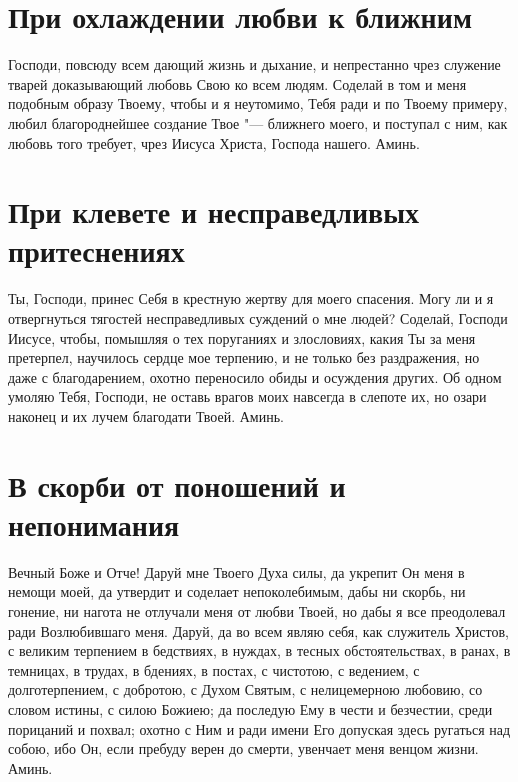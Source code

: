 \section{При охлаждении любви к ближним}\begin{mymulticols}
 

Господи, повсюду всем дающий жизнь и дыхание, и непрестанно чрез служение тварей доказывающий любовь Свою ко всем людям. Соделай в том и меня подобным образу Твоему, чтобы и я неутомимо, Тебя ради и по Твоему примеру, любил благороднейшее создание Твое "--- ближнего моего, и поступал с ним, как любовь того требует, чрез Иисуса Христа, Господа нашего. Аминь.

\end{mymulticols}

\section{При клевете и несправедливых притеснениях}\begin{mymulticols}
 

Ты, Господи, принес Себя в крестную жертву для моего спасения. Могу ли и я отвергнуться тягостей несправедливых суждений о мне людей? Соделай, Господи Иисусе, чтобы, помышляя о тех поруганиях и злословиях, какия Ты за меня претерпел, научилось сердце мое терпению, и не только без раздражения, но даже с благодарением, охотно переносило обиды и осуждения других. Об одном умоляю Тебя, Господи, не оставь врагов моих навсегда в слепоте их, но озари наконец и их лучем благодати Твоей. Аминь.

\end{mymulticols}

\section{В скорби от поношений и непонимания}\begin{mymulticols}
 

Вечный Боже и Отче! Даруй мне Твоего Духа силы, да укрепит Он меня в немощи моей, да утвердит и соделает непоколебимым, дабы ни скорбь, ни гонение, ни нагота не отлучали меня от любви Твоей, но дабы я все преодолевал ради Возлюбившаго меня. Даруй, да во всем являю себя, как служитель Христов, с великим терпением в бедствиях, в нуждах, в тесных обстоятельствах, в ранах, в темницах, в трудах, в бдениях, в постах, с чистотою, с ведением, с долготерпением, с добротою, с Духом Святым, с нелицемерною любовию, со словом истины, с силою Божиею; да последую Ему в чести и безчестии, среди порицаний и похвал; охотно с Ним и ради имени Его допуская здесь ругаться над собою, ибо Он, если пребуду верен до смерти, увенчает меня венцом жизни. Аминь.

\end{mymulticols}

